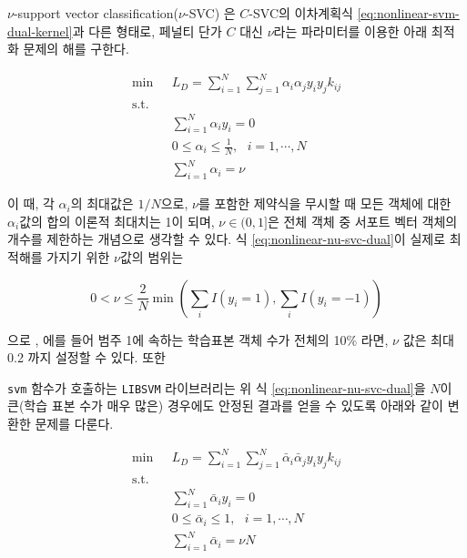 \documentclass[]{book}
\begin{document}
\(\nu\)-support vector classification(\(\nu\)-SVC) \citep[\citet{chang2001training}]{scholkopf2000new}은 \(C\)-SVC의 이차계획식 \eqref{eq:nonlinear-svm-dual-kernel}과 다른 형태로, 페널티 단가 \(C\) 대신 \(\nu\)라는 파라미터를 이용한 아래 최적화 문제의 해를 구한다.

\begin{equation}
\begin{split}
\min \text{  } & L_D = \sum_{i = 1}^{N} \sum_{j = 1}^{N} \alpha_i \alpha_j y_i y_j k_{ij}\\
\text{s.t. } &\\
& \sum_{i = 1}^{N} \alpha_i y_i = 0\\
& 0 \le \alpha_i \le \frac{1}{N}, \text{  } i = 1, \cdots, N\\
& \sum_{i = 1}^{N} \alpha_i = \nu
\end{split}
\label{eq:nonlinear-nu-svc-dual}
\end{equation}

이 때, 각 \(\alpha_i\)의 최대값은 \(1/N\)으로, \(\nu\)를 포함한 제약식을 무시할 때 모든 객체에 대한 \(\alpha_i\)값의 합의 이론적 최대치는 1이 되며, \(\nu \in (0, 1]\)은 전체 객체 중 서포트 벡터 객체의 개수를 제한하는 개념으로 생각할 수 있다. 식 \eqref{eq:nonlinear-nu-svc-dual}이 실제로 최적해를 가지기 위한 \(\nu\)값의 범위는

\begin{equation*}
0 < \nu \le \frac{2}{N} \min \left( \sum_i I(y_i = 1), \sum_i I(y_i = -1) \right)
\end{equation*}

으로 \citep{chang2001training}, 에를 들어 범주 1에 속하는 학습표본 객체 수가
전체의 10\% 라면, \(\nu\) 값은 최대 0.2 까지 설정할 수 있다. 또한

\texttt{svm} 함수가 호출하는 \texttt{LIBSVM} 라이브러리는 위 식 \eqref{eq:nonlinear-nu-svc-dual}을 \(N\)이 큰(학습 표본 수가 매우 많은) 경우에도 안정된 결과를 얻을 수 있도록 아래와 같이 변환한 문제를 다룬다.

\begin{equation}
\begin{split}
\min \text{  } & L_D = \sum_{i = 1}^{N} \sum_{j = 1}^{N} \bar{\alpha}_i \bar{\alpha}_j y_i y_j k_{ij}\\
\text{s.t. } &\\
& \sum_{i = 1}^{N} \bar{\alpha}_i y_i = 0\\
& 0 \le \bar{\alpha}_i \le 1, \text{  } i = 1, \cdots, N\\
& \sum_{i = 1}^{N} \bar{\alpha}_i = \nu N
\end{split}
\label{eq:libsvm-nu-svc-dual}
\end{equation}
\end{document}
